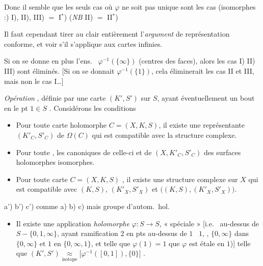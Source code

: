 \documentclass[11pt,a4paper]{article}
\begin{document}

Donc il semble que les seuls cas
où $\varphi$ ne soit pas unique sont les cas
(isomorphes :) I), II), III) $=$ I$^{*}$) (\emph{NB} II) $=$ II$^{*}$)

Il faut cependant tirer au clair
entièrement l'\emph{argument} de représentation conforme, et voir s'il s'applique
aux cartes infinies.

Si on se donne en plus  l'ens.\ \struck{\ill{}}
$\varphi^{-1}(\{\infty\})$ (centres des faces), alors les cas I) II) III)
sont éliminés. [Si on se donnait
$\varphi^{-1}(\{1\})$, cela éliminerait les cas
II et III, mais non le cas I\ldots]


\emph{Opération} , définie par une 
carte $(K', S')$ sur $S$, ayant éventuellement
un bout  en le pt $1 \in S$
.
Considérons les conditions
\begin{itemize}
  \item[a)] Pour toute carte holomorphe $C = (X, K, S)$, il existe
   une représentante $(K'_C, S'_C)$ de $\Omega(C)$ qui est
  compatible avec la structure complexe.
  \item[b)] Pour toute  , les 
    canoniques de celle-ci et de
  $(X, K'_C, S'_C)$    \struck{\ill{}} des surfaces 
  \struck{\ill{}} holomorphes isomorphes.
    \item[c)]  Pour toute carte $C = (X, K, S)$ , il existe
  une structure complexe sur $X$
  qui est compatible avec $(K, S)$, $(K'_X, S'_X)$ et
   \uncertain{\ill{}} $\bigl((K,S), (K'_X, S'_X)\bigr)$.
\end{itemize}
a') b') c') comme a) b) c) mais  groupe d'autom.\ hol.
\begin{itemize}
  \item[d)] Il existe une application \emph{holomorphe}
  $\varphi : S \to S$,  « spéciale » [i.e.\  
  au-dessus de $S - \{0, 1, \infty\}$,
  \struck{\ill{}} ayant ramification \struck{\ill{}} \add{$\leqslant$} $2$
  en  pts au-dessus de $1$ \struck{\ill{}} \uncertain{\ill{}}~$1$,
  ,  $\{0, \infty\}$ dans $\{0, \infty\}$ et
  $1$ en $\{0, \infty, 1\}$, et telle que \struck{\ill{}} $\varphi(1) = 1$
    que $\varphi$ est étale en $1$)] telle que
  $(K', S') \underset{\text{isotope}}{\approx} \bigl[\varphi^{-1}([0,1]), \{0\}\bigr]$
  .
\end{itemize}

\end{document}
